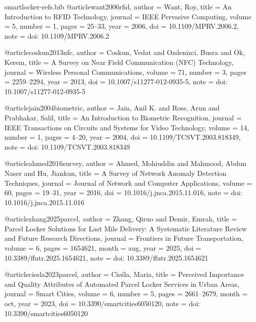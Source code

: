 \begin{filecontents*}[overwrite]{smartlocker-refs.bib}
@article{want2006rfid,
  author  = {Want, Roy},
  title   = {An Introduction to {RFID} Technology},
  journal = {IEEE Pervasive Computing},
  volume  = {5},
  number  = {1},
  pages   = {25--33},
  year    = {2006},
  doi     = {10.1109/MPRV.2006.2},
  note    = {doi: 10.1109/MPRV.2006.2}
}

@article{coskun2013nfc,
  author  = {Coskun, Vedat and Ozdenizci, Busra and Ok, Kerem},
  title   = {A Survey on Near Field Communication ({NFC}) Technology},
  journal = {Wireless Personal Communications},
  volume  = {71},
  number  = {3},
  pages   = {2259--2294},
  year    = {2013},
  doi     = {10.1007/s11277-012-0935-5},
  note    = {doi: 10.1007/s11277-012-0935-5}
}

@article{jain2004biometric,
  author  = {Jain, Anil K. and Ross, Arun and Prabhakar, Salil},
  title   = {An Introduction to Biometric Recognition},
  journal = {IEEE Transactions on Circuits and Systems for Video Technology},
  volume  = {14},
  number  = {1},
  pages   = {4--20},
  year    = {2004},
  doi     = {10.1109/TCSVT.2003.818349},
  note    = {doi: 10.1109/TCSVT.2003.818349}
}

@article{ahmed2016survey,
  author  = {Ahmed, Mohiuddin and Mahmood, Abdun Naser and Hu, Jiankun},
  title   = {A Survey of Network Anomaly Detection Techniques},
  journal = {Journal of Network and Computer Applications},
  volume  = {60},
  pages   = {19--31},
  year    = {2016},
  doi     = {10.1016/j.jnca.2015.11.016},
  note    = {doi: 10.1016/j.jnca.2015.11.016}
}


@article{zhang2025parcel,
  author  = {Zhang, Qiruo and Demir, Emrah},
  title   = {Parcel Locker Solutions for Last Mile Delivery: A Systematic Literature Review and Future Research Directions},
  journal = {Frontiers in Future Transportation},
  volume  = {6},
  pages   = {1654621},
  month   = aug,
  year    = {2025},
  doi     = {10.3389/ffutr.2025.1654621},
  note    = {doi: 10.3389/ffutr.2025.1654621}
}

@article{ciesla2023parcel,
  author  = {Cie{\'s}la, Maria},
  title   = {Perceived Importance and Quality Attributes of Automated Parcel Locker Services in Urban Areas},
  journal = {Smart Cities},
  volume  = {6},
  number  = {5},
  pages   = {2661--2679},
  month   = oct,
  year    = {2023},
  doi     = {10.3390/smartcities6050120},
  note    = {doi: 10.3390/smartcities6050120}
}


\end{filecontents*}
